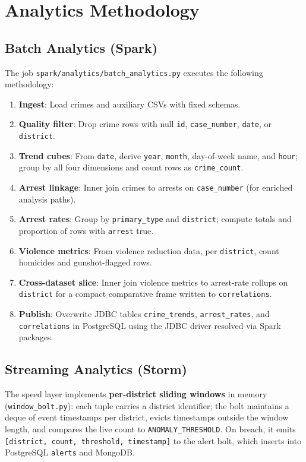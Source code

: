 \documentclass[12pt,a4paper]{article}
\begin{document}
\section{Analytics Methodology}
\label{sec:analytics}

\subsection{Batch Analytics (Spark)}
The job \texttt{spark/analytics/batch\_analytics.py} executes the following methodology:
\begin{enumerate}
    \item \textbf{Ingest}: Load crimes and auxiliary CSVs with fixed schemas.
    \item \textbf{Quality filter}: Drop crime rows with null \texttt{id}, \texttt{case\_number}, \texttt{date}, or \texttt{district}.
    \item \textbf{Trend cubes}: From \texttt{date}, derive \texttt{year}, \texttt{month}, day-of-week name, and \texttt{hour}; group by all four dimensions and count rows as \texttt{crime\_count}.
    \item \textbf{Arrest linkage}: Inner join crimes to arrests on \texttt{case\_number} (for enriched analysis paths).
    \item \textbf{Arrest rates}: Group by \texttt{primary\_type} and \texttt{district}; compute totals and proportion of rows with \texttt{arrest} true.
    \item \textbf{Violence metrics}: From violence reduction data, per \texttt{district}, count homicides and gunshot-flagged rows.
    \item \textbf{Cross-dataset slice}: Inner join violence metrics to arrest-rate rollups on \texttt{district} for a compact comparative frame written to \texttt{correlations}.
    \item \textbf{Publish}: Overwrite JDBC tables \texttt{crime\_trends}, \texttt{arrest\_rates}, and \texttt{correlations} in PostgreSQL using the JDBC driver resolved via Spark packages.
\end{enumerate}

\subsection{Streaming Analytics (Storm)}
The speed layer implements \textbf{per-district sliding windows} in memory (\texttt{window\_bolt.py}): each tuple carries a district identifier; the bolt maintains a deque of event timestamps per district, evicts timestamps outside the window length, and compares the live count to \texttt{ANOMALY\_THRESHOLD}. On breach, it emits \texttt{[district, count, threshold, timestamp]} to the alert bolt, which inserts into PostgreSQL \texttt{alerts} and MongoDB.
\end{document}
